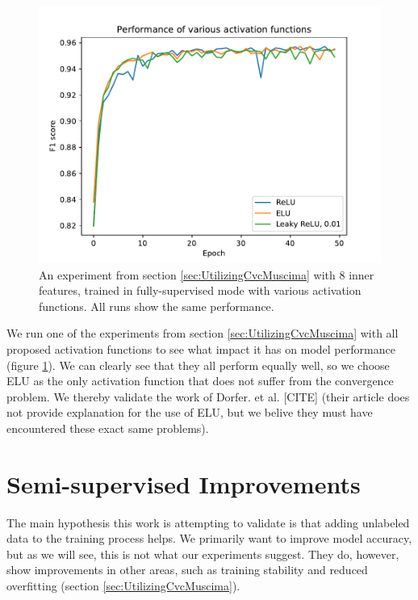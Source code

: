 \begin{figure}[ht]
    \centering
    \includegraphics[width=140mm]{../../figures/03-activation-function/performance.pdf}
    \caption{An experiment from section \ref{sec:UtilizingCvcMuscima} with 8 inner features, trained in fully-supervised mode with various activation functions. All runs show the same performance.}
    \label{fig:ActivationFunctionPerformances}
\end{figure}

We run one of the experiments from section \ref{sec:UtilizingCvcMuscima} with all proposed activation functions to see what impact it has on model performance (figure \ref{fig:ActivationFunctionPerformances}). We can clearly see that they all perform equally well, so we choose ELU as the only activation function that does not suffer from the convergence problem. We thereby validate the work of Dorfer. et al. [CITE] (their article does not provide explanation for the use of ELU, but we belive they must have encountered these exact same problems).


\section{Semi-supervised Improvements}
\label{sec:SemisupervisedImprovements}

The main hypothesis this work is attempting to validate is that adding unlabeled data to the training process helps. We primarily want to improve model accuracy, but as we will see, this is not what our experiments suggest. They do, however, show improvements in other areas, such as training stability and reduced overfitting (section \ref{sec:UtilizingCvcMuscima}).

